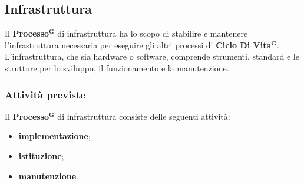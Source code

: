 \documentclass[a4paper,12pt]{article}
\newcommand{\term}[1]{\textbf{#1}$^\mathbf{G}$}
\begin{document}
\subsection{Infrastruttura}
\label{sec:infrastruttura}
Il \term{Processo} di infrastruttura ha lo scopo di stabilire e mantenere l'infrastruttura necessaria per eseguire gli altri processi di \term{Ciclo Di Vita}.\\L'infrastruttura, che sia hardware o software, comprende strumenti, standard e le strutture per lo sviluppo, il funzionamento e la manutenzione.

\subsubsection{Attività previste}
Il \term{Processo} di infrastruttura consiste delle seguenti attività:
\begin{itemize}
    \item \textbf{implementazione};
    \item \textbf{istituzione};
    \item \textbf{manutenzione}.
\end{itemize}
\end{document}
